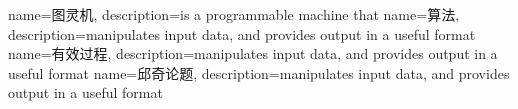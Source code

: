 {
  name=图灵机,
  description={is a programmable machine that}
}
{
  name=算法,
  description={manipulates input data, and provides output in a useful format}
}
{
  name=有效过程,
  description={manipulates input data, and provides output in a useful format}
}
{
  name=邱奇论题,
  description={manipulates input data, and provides output in a useful format}
}

